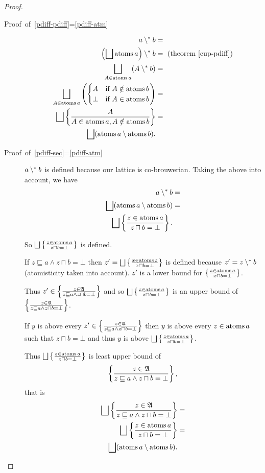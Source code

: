 \begin{proof}
~
\begin{description}
\item [{Proof~of~\ref{pdiff-pdiff}=\ref{pdiff-atm}}] 
\begin{align*}
a\psetminus b & =\\
\left(\bigsqcup\atoms a\right)\psetminus b & =\text{ (theorem \ref{cup-pdiff})}\\
\bigsqcup_{A\in\atoms a}(A\psetminus b) & =\\
\bigsqcup_{A\in\atoms a}\left(\begin{cases}
A & \text{if }A\notin\atoms b\\
\bot & \text{if }A\in\atoms b
\end{cases}\right) & =\\
\bigsqcup\setcond A{A\in\atoms a,A\notin\atoms b} & =\\
\bigsqcup(\atoms a\setminus\atoms b).
\end{align*}

\item [{Proof~of~\ref{pdiff-sec}=\ref{pdiff-atm}}] $a\setminus^{\ast} b$
is defined because our lattice is co-brouwerian. Taking the above
into account, we have
\begin{align*}
a\psetminus b & =\\
\bigsqcup(\atoms a\setminus\atoms b) & =\\
\bigsqcup\setcond{z\in\atoms a}{z\sqcap b=\bot}.
\end{align*}



So $\bigsqcup\setcond{z\in\atoms a}{z\sqcap b=\bot}$ is defined.


If $z\sqsubseteq a\land z\sqcap b=\bot$ then $z'=\bigsqcup\setcond{x\in\atoms z}{x\sqcap b=\bot}$
is defined because $z'=z\setminus^{\ast} b$ (atomisticity taken into account).
$z'$ is a lower bound for $\left\{ \frac{z\in\operatorname{atoms} a}{x\sqcap b=\bot}\right\}$.


Thus $z'\in\left\{ \frac{z\in\mathfrak{A}}{z\sqsubseteq a\land z\sqcap b=\bot}\right\}$
and so $\bigsqcup\setcond{z\in\atoms a}{z\sqcap b=\bot}$ is an upper
bound of $\left\{ \frac{z\in\mathfrak{A}}{z\sqsubseteq a\land z\sqcap b=\bot}\right\}$.


If $y$ is above every $z'\in\left\{ \frac{z\in\mathfrak{A}}{z\sqsubseteq a\land z\sqcap b=\bot}\right\}$
then $y$ is above every $z\in\operatorname{atoms} a$ such that $z\sqcap b=\bot$
and thus $y$ is above $\bigsqcup\setcond{z\in\atoms a}{z\sqcap b=\bot}$.


Thus $\bigsqcup\setcond{z\in\atoms a}{z\sqcap b=\bot}$ is least upper
bound of
\[
\left\{ \frac{z\in\mathfrak{A}}{z\sqsubseteq a\land z\sqcap b=\bot}\right\},
\]
that is
\begin{align*}
\bigsqcup\setcond{z\in\mathfrak{A}}{z\sqsubseteq a\land z\sqcap b=\bot} & =\\
\bigsqcup\setcond{z\in\atoms a}{z\sqcap b=\bot} & =\\
\bigsqcup(\atoms a\setminus\atoms b).
\end{align*}


\end{description}
\end{proof}

